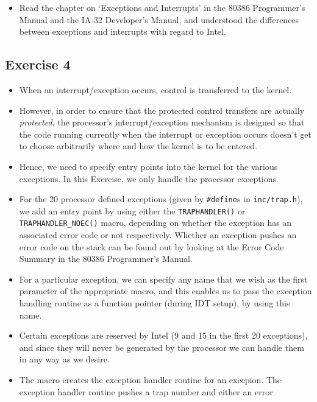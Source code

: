 \documentclass[]{article}
\begin{document}
\begin{itemize}
\itemsep1pt\parskip0pt
\item
  Read the chapter on `Exceptions and Interrupts' in the 80386
  Programmer's Manual and the IA-32 Developer's Manual, and understood
  the differences between exceptions and interrupts with regard to
  Intel.
\end{itemize}

\subsection{Exercise 4}

\begin{itemize}
\itemsep1pt\parskip0pt
\item
  When an interrupt/exception occurs, control is transferred to the
  kernel.
\item
  However, in order to ensure that the protected control transfers are
  actually \emph{protected}, the processor's interrupt/exception
  mechanism is designed so that the code running currently when the
  interrupt or exception occurs doesn't get to choose arbitrarily where
  and how the kernel is to be entered.
\item
  Hence, we need to specify entry points into the kernel for the various
  exceptions. In this Exercise, we only handle the processor exceptions.
\item
  For the 20 processor defined exceptions (given by \texttt{\#define}s
  in \texttt{inc/trap.h}), we add an entry point by using either the
  \texttt{TRAPHANDLER()} or \texttt{TRAPHANDLER\_NOEC()} macro,
  depending on whether the exception has an associated error code or not
  respectively. Whether an exception pushes an error code on the stack
  can be found out by looking at the Error Code Summary in the 80386
  Programmer's Manual.
\item
  For a particular exception, we can specify any name that we wish as
  the first parameter of the appropriate macro, and this enables us to
  pass the exception handling routine as a function pointer (during IDT
  setup), by using this name.
\item
  Certain exceptions are reserved by Intel (9 and 15 in the first 20
  exceptions), and since they will never be generated by the processor
  we can handle them in any way as we desire.
\item
  The macro creates the exception handler routine for an excepion. The
  exception handler routine pushes a trap number and either an error

\end{itemize}
\end{document}

